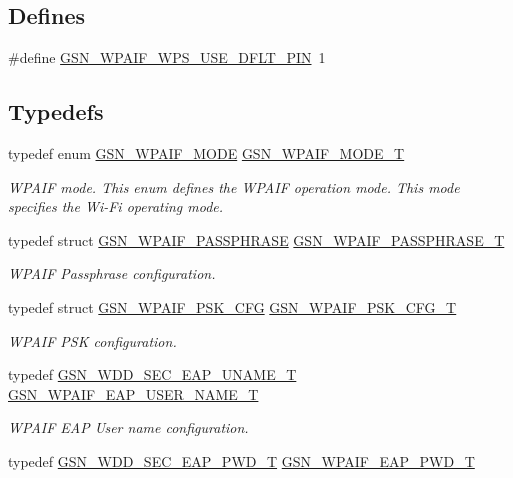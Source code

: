 \subsection*{Defines}
\begin{DoxyCompactItemize}
\item 
\#define \hyperlink{a00615_a30cd731d42e99f100b546b0674155194}{GSN\_\-WPAIF\_\-WPS\_\-USE\_\-DFLT\_\-PIN}~1
\end{DoxyCompactItemize}
\subsection*{Typedefs}
\begin{DoxyCompactItemize}
\item 
typedef enum \hyperlink{a00687_gaa611307c118e60b86fe3447c4dd9ef03}{GSN\_\-WPAIF\_\-MODE} \hyperlink{a00687_gafdd00105be3584713f485995fb16fc07}{GSN\_\-WPAIF\_\-MODE\_\-T}
\begin{DoxyCompactList}\small\item\em WPAIF mode. This enum defines the WPAIF operation mode. This mode specifies the Wi-\/Fi operating mode. \end{DoxyCompactList}\item 
typedef struct \hyperlink{a00424}{GSN\_\-WPAIF\_\-PASSPHRASE} \hyperlink{a00687_ga3cab0646203b96a6bc26d38587ecba02}{GSN\_\-WPAIF\_\-PASSPHRASE\_\-T}
\begin{DoxyCompactList}\small\item\em WPAIF Passphrase configuration. \end{DoxyCompactList}\item 
typedef struct \hyperlink{a00425}{GSN\_\-WPAIF\_\-PSK\_\-CFG} \hyperlink{a00687_ga76d386ef77db02abc848f5e9a50cd8e5}{GSN\_\-WPAIF\_\-PSK\_\-CFG\_\-T}
\begin{DoxyCompactList}\small\item\em WPAIF PSK configuration. \end{DoxyCompactList}\item 
typedef \hyperlink{a00290}{GSN\_\-WDD\_\-SEC\_\-EAP\_\-UNAME\_\-T} \hyperlink{a00687_ga0200d673ac133f30a5c4eb16fef8c3a4}{GSN\_\-WPAIF\_\-EAP\_\-USER\_\-NAME\_\-T}
\begin{DoxyCompactList}\small\item\em WPAIF EAP User name configuration. \end{DoxyCompactList}\item 
typedef \hyperlink{a00289}{GSN\_\-WDD\_\-SEC\_\-EAP\_\-PWD\_\-T} \hyperlink{a00687_gad6577531dfde003b7207ae0eb46aabee}{GSN\_\-WPAIF\_\-EAP\_\-PWD\_\-T}

\end{DoxyCompactItemize}
